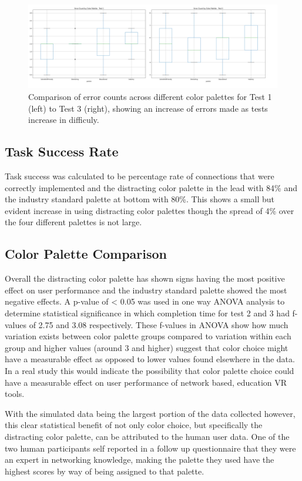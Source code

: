 \documentclass[acmlarge]{acmart}
\begin{document}
\begin{figure} [H]
  \centering
  \includegraphics[width=1\textwidth]{error_count_test1_and3.png}
  \caption{Comparison of error counts across different color palettes for Test 1 (left) to Test 3 (right), showing an increase of errors made as tests increase in difficuly.}
  \label{fig:errorcounttest1and3}
\end{figure}

\subsection{Task Success Rate}
Task success was calculated to be percentage rate of connections that were correctly implemented and the distracting color palette in the lead with 84\% and the industry standard palette at bottom with 80\%. This shows a small but evident increase in using distracting color palettes though the spread of 4\% over the four different palettes is not large. 

\subsection{Color Palette Comparison}
Overall the distracting color palette has shown signs having the most positive effect on user performance and the industry standard palette showed the most negative effects. A p-value of < 0.05 was used in one way ANOVA analysis to determine statistical significance in which completion time for test 2 and 3 had f-values of 2.75 and 3.08 respectively. These f-values in ANOVA show how much variation exists between color palette groups compared to variation within each group and higher values (around 3 and higher) suggest that color choice might have a measurable effect as opposed to lower values found elsewhere in the data. In a real study this would indicate the possibility that color palette choice could have a measurable effect on user performance of network based, education VR tools.

With the simulated data being the largest portion of the data collected however, this clear statistical benefit of not only color choice, but specifically the distracting color palette, can be attributed to the human user data. One of the two human participants self reported in a follow up questionnaire that they were an expert in networking knowledge, making the palette they used have the highest scores by way of being assigned to that palette. 
\end{document}
